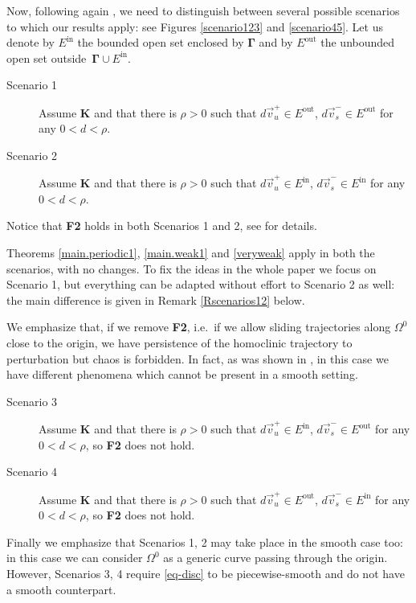 \documentclass[10pt]{article}
\numberwithin{equation}{section}
\def\Om{\Omega}
\newcommand\bs[1]{{\boldsymbol{#1}}}
\newcommand\assump[1]{{\rm\textbf{#1}}}
\theoremstyle{definition}
\theoremstyle{remark}
\begin{document}
Now, following again \cite{CFPRimut}, we need to distinguish between several possible scenarios to which our results apply: see Figures \ref{scenario123} and \ref{scenario45}. Let us denote by $E^{\textrm{in}}$ the bounded open set enclosed by $\bs{\Gamma}$ and by
  $E^{\textrm{out}}$ the unbounded open set outside~$\bs{\Gamma}\cup E^{\textrm{in}}$.
 \begin{description}
\item[Scenario 1] Assume \assump{K} and that there is $\rho>0$ such that $d\vec{v}_u^+ \in E^{\textrm{out}}$, $d\vec{v}_s^- \in
    E^{\textrm{out}}$ for any $0<d<\rho$.
\item[Scenario 2] Assume \assump{K} and that there is $\rho>0$ such that $d\vec{v}_u^+ \in E^{\textrm{in}}$, $d\vec{v}_s^- \in
    E^{\textrm{in}}$ for any $0<d<\rho$.
\end{description}
Notice that  \assump{F2} holds in both Scenarios 1 and 2, see \cite{CFPRimut} for details.

Theorems \ref{main.periodic1},  \ref{main.weak1}  and \ref{veryweak} apply in both the scenarios, with
no changes.
  To fix the ideas in the whole paper we
focus on Scenario 1, but everything can be adapted without effort to Scenario 2 as well: the main difference is given
in Remark \ref{Rscenarios12} below.



We emphasize that, if we remove \assump{F2}, i.e.\ if we allow sliding trajectories along $\Om^0$ close to the origin,
we have persistence of the homoclinic trajectory to perturbation but chaos is forbidden. In fact, as was shown in \cite{FrPo}, in this case we have different phenomena which cannot be present in a smooth setting.
\begin{description}
\item[Scenario 3]
Assume \assump{K} and that there is $\rho>0$ such that $d\vec{v}_u^+ \in E^{\textrm{in}}$, $d\vec{v}_s^- \in E^{\textrm{out}}$ for any
$0<d<\rho$, so
    \assump{F2} does not hold.
\item[Scenario 4]
Assume \assump{K} and that there is $\rho>0$ such that $d\vec{v}_u^+ \in E^{\textrm{out}}$, $d\vec{v}_s^- \in E^{\textrm{in}}$ for any
$0<d<\rho$, so
    \assump{F2} does not hold.
\end{description}




Finally we emphasize that Scenarios 1, 2    may take place in the smooth case too: in this case we can consider $\Om^0$ as a generic curve
passing
through the origin. However, Scenarios 3, 4   require \eqref{eq-disc} to be   piecewise-smooth and do not have a smooth counterpart.
\end{document}
